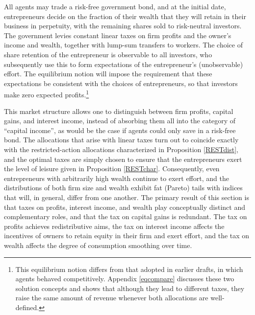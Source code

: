 \documentclass[11pt]{article}
\theoremstyle{plain}
\begin{document}
All agents may trade a risk-free government bond, and at the initial date, entrepreneurs decide on the fraction of their wealth that they will retain in their business in perpetuity, with the remaining shares sold to risk-neutral investors. The government levies constant linear taxes on firm profits and the owner's income and wealth, together with lump-sum transfers to workers. The choice of share retention of the entrepreneur is observable to all investors, who subsequently use this to form expectations of the entrepreneur's (unobservable) effort. The equilibrium notion will impose the requirement that these expectations be consistent with the choices of entrepreneurs, so that investors make zero expected profits.\footnote{This equilibrium notion differs from that adopted in earlier drafts, in which agents behaved competitively. Appendix \ref{eqcompare} discusses these two solution concepts and shows that although they lead to different taxes, they raise the same amount of revenue whenever both allocations are well-defined.}


This market structure allows one to distinguish between firm profits, capital gains, and interest income, instead of absorbing them all into the category of ``capital income'', as would be the case if agents could only save in a risk-free bond. The allocations that arise with linear taxes turn out to coincide exactly with the restricted-action allocations characterized in Proposition \ref{RESTdist}, and the optimal taxes are simply chosen to ensure that the entrepreneurs exert the level of leisure given in Proposition \ref{RESTchar}. Consequently, even entrepreneurs with arbitrarily high wealth continue to exert effort, and the distributions of both firm size and wealth exhibit fat (Pareto) tails with indices that will, in general, differ from one another. The primary result of this section is that taxes on profits, interest income, and wealth play conceptually distinct and complementary roles, and that the tax on capital gains is redundant. The tax on profits achieves redistributive aims, the tax on interest income affects the incentives of owners to retain equity in their firm and exert effort, and the tax on wealth affects the degree of consumption smoothing over time.

\end{document}
